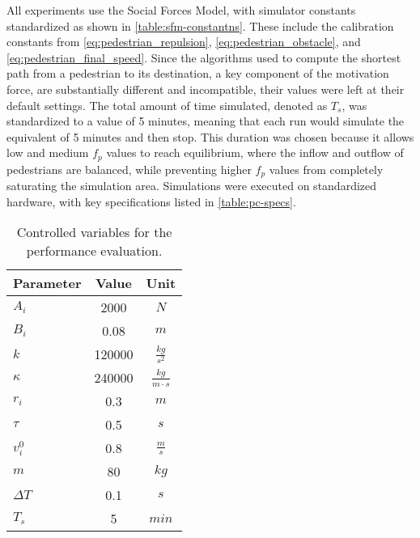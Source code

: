 \documentclass[twoside, 11pt]{article}
\begin{document}
All experiments use the Social Forces Model, with simulator constants standardized as shown in \autoref{table:sfm-constantns}. These include the calibration constants from \autoref{eq:pedestrian_repulsion}, \autoref{eq:pedestrian_obstacle}, and \autoref{eq:pedestrian_final_speed}. Since the algorithms used to compute the shortest path from a pedestrian to its destination, a key component of the motivation force, are substantially different and incompatible, their values were left at their default settings. The total amount of time simulated, denoted as $T_s$, was standardized to a value of 5 minutes, meaning that each run would simulate the equivalent of 5 minutes and then stop. This duration was chosen because it allows low and medium $f_p$ values to reach equilibrium, where the inflow and outflow of pedestrians are balanced, while preventing higher $f_p$ values from completely saturating the simulation area. Simulations were executed on standardized hardware, with key specifications listed in \autoref{table:pc-specs}.

\begin{table}[h]
  \caption[Controlled variables for the performance evaluation]{Controlled variables for the performance evaluation.}
  \begin{center}
    \begin{tabular}{ | l | c | c | } 
      \hline
      Parameter & Value & Unit\\ 
      \hline 
      $A_i$ & 2000 & $N$\\
      \hline
      $B_i$ & 0.08 & $m$\\
      \hline
      $k$ & 120000 & $\frac{kg}{s^2}$\\
      \hline
      $\kappa$ & 240000 & $\frac{kg}{m \cdot s}$\\
      \hline
      $r_i$ & 0.3 & $m$\\
      \hline
      $\tau$ & 0.5 & $s$\\
      \hline
      $v_i^0$ & 0.8 & $\frac{m}{s}$\\
      \hline
      $m$ & 80 & $kg$\\
      \hline
      $\Delta T$ & 0.1 & $s$\\
      \hline 
      $T_s$ & 5 & $min$\\
      \hline 
    \end{tabular}
    \label{table:sfm-constantns}
  \end{center}
\end{table}
\end{document}
